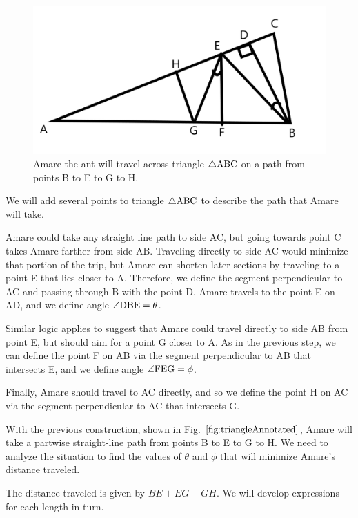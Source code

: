 \documentclass[reqno]{amsart}
\begin{document}
\begin{figure}[h]
	\centering
	\includegraphics[scale = 0.3]{TriangleAnnotated.png}
	\caption{Amare the ant will travel across triangle $\triangle\rm ABC$ on a path from points B to E to G to H.}
	\label{fig:triangleAnnotated}
\end{figure}

We will add several points to triangle $\triangle\rm ABC$ to describe the path that Amare will take. 

Amare could take any straight line path to side AC, but going towards point C takes Amare farther from side AB. Traveling directly to side AC would minimize that portion of the trip, but Amare can shorten later sections by traveling to a point E that lies closer to A. Therefore, we define the segment perpendicular to AC and passing through B with the point D. Amare travels to the point E on AD, and we define angle $\angle{\rm DBE}=\theta$. 

Similar logic applies to suggest that Amare could travel directly to side AB from point E, but should aim for a point G closer to A. As in the previous step, we can define the point F on AB via the segment perpendicular to AB that intersects E, and we define angle $\angle{\rm FEG}=\phi$. 

Finally, Amare should travel to AC directly, and so we define the point H on AC via the segment perpendicular to AC that intersects G. 

With the previous construction, shown in Fig. $\ref{fig:triangleAnnotated}$, Amare will take a partwise straight-line path from points B to E to G to H. We need to analyze the situation to find the values of $\theta$ and $\phi$ that will minimize Amare's distance traveled. 

The distance traveled is given by $\overline{BE} + \overline{EG} +\overline{GH}$. We will develop expressions for each length in turn.
\end{document}
